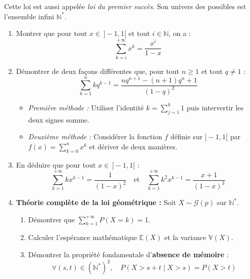\documentclass[11pt,a4paper]{article}
\newcommand{\N}{\mathbb{N}}
\newcommand{\E}{\mathbb{E}}
\newcommand{\V}{\mathbb{V}}
\begin{document}
Cette loi est aussi appelée \emph{loi du premier succès}. Son univers des possibles est l'ensemble infini $\N^*$.
\begin{enumerate}[label=\arabic*.]
    \item Montrer que pour tout $x \in \,]-1, 1[$ et tout $i \in \N$, on a :
    \[
    \sum_{k=i}^{+\infty} x^k = \frac{x^i}{1 - x}
    \]
    \item Démontrer de deux façons différentes que, pour tout $n \ge 1$ et tout $q \neq 1$ :
    \[
    \sum_{k=1}^n k q^{k-1} = \frac{n q^{n+1} - (n+1) q^n + 1}{(1 - q)^2}
    \]
    \begin{itemize}[label=$\bullet$]
        \item \emph{Première méthode :} Utiliser l'identité $k = \sum_{j=1}^k 1$ puis intervertir les deux signes somme.
        \item \emph{Deuxième méthode :} Considérer la fonction $f$ définie sur $]-1, 1[$ par $f(x) = \sum_{k=0}^n x^k$ et dériver de deux manières.
    \end{itemize}
    \item En déduire que pour tout $x \in \,]-1, 1[$ :
    \[
    \sum_{k=1}^{+\infty} k x^{k-1} = \frac{1}{(1 - x)^2} \quad \text{et} \quad \sum_{k=1}^{+\infty} k^2 x^{k-1} = \frac{x + 1}{(1 - x)^3}
    \]
    \item \textbf{Théorie complète de la loi géométrique :} Soit $X \sim \mathcal{G}(p)$ sur $\N^*$.
    \begin{enumerate}
        \item Démontrer que $\sum_{k=1}^{+\infty} P(X = k) = 1$.
        \item Calculer l'espérance mathématique $\E(X)$ et la variance $\V(X)$.
        \item Démontrer la propriété fondamentale d'\textbf{absence de mémoire} :
        \[
        \forall (s, t) \in (\N^*)^2, \quad P(X > s + t \mid X > s) = P(X > t)
        \]
    \end{enumerate}
\end{enumerate}
\end{document}
